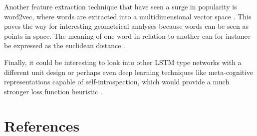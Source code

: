 \documentclass[a4paper]{article}
\begin{document}
Another feature extraction technique that have seen a surge in popularity is
word2vec, where words are extracted into a multidimensional vector space
\citep{Schmidhuber2015}.
This paves the way for interesting geometrical analyses because words can be seen as
points in space. The meaning of one word in relation to another
can for instance be expressed as the euclidean distance
\citep{Russell2009, Schmidhuber2015}.

Finally, it could be interesting to look into other LSTM type networks
with a different unit design \citep{Schmidhuber2015} or perhaps even deep
learning techniques like meta-cognitive representations capable of
self-introspection, which would provide a much stronger loss function heuristic
\citep{COX2005}.

\clearpage
\renewcommand*{\refname}{}
\section{References}



\end{document}
